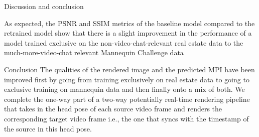 Discussion and conclusion

As expected, the PSNR and SSIM metrics of the baseline model compared to the retrained model show that there is a slight improvement in the performance of a model trained exclusive on the non-video-chat-relevant real estate data to the much-more-video-chat relevant Mannequin Challenge data 

Conclusion 
The qualities of the rendered image and the predicted MPI have been improved first by going from training exclusively on real estate data to going to exclusive training on mannequin data and then finally onto a mix of both. We complete the one-way part of a two-way potentially real-time rendering pipeline that takes in the head pose of each source video frame and renders the corresponding target video frame i.e., the one that syncs with the timestamp of the source in this head pose.   

